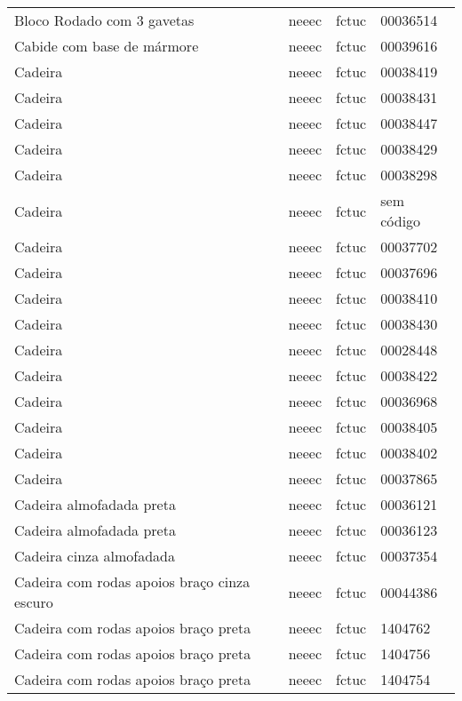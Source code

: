 \begin{longtable}{Xlll}
Bloco Rodado com 3 gavetas & \acrshort{neeec} & \acrshort{fctuc} & 00036514\\
Cabide com base de mármore & \acrshort{neeec} & \acrshort{fctuc} & 00039616\\
Cadeira & \acrshort{neeec} & \acrshort{fctuc} & 00038419\\
Cadeira & \acrshort{neeec} & \acrshort{fctuc} & 00038431\\
Cadeira & \acrshort{neeec} & \acrshort{fctuc} & 00038447\\
Cadeira & \acrshort{neeec} & \acrshort{fctuc} & 00038429\\
Cadeira & \acrshort{neeec} & \acrshort{fctuc} & 00038298\\
Cadeira & \acrshort{neeec} & \acrshort{fctuc} & sem código\\
Cadeira & \acrshort{neeec} & \acrshort{fctuc} & 00037702\\
Cadeira & \acrshort{neeec} & \acrshort{fctuc} & 00037696\\
Cadeira & \acrshort{neeec} & \acrshort{fctuc} & 00038410\\
Cadeira & \acrshort{neeec} & \acrshort{fctuc} & 00038430\\
Cadeira & \acrshort{neeec} & \acrshort{fctuc} & 00028448\\
Cadeira & \acrshort{neeec} & \acrshort{fctuc} & 00038422\\
Cadeira & \acrshort{neeec} & \acrshort{fctuc} & 00036968\\
Cadeira & \acrshort{neeec} & \acrshort{fctuc} & 00038405\\
Cadeira & \acrshort{neeec} & \acrshort{fctuc} & 00038402\\
Cadeira & \acrshort{neeec} & \acrshort{fctuc} & 00037865\\
Cadeira almofadada preta & \acrshort{neeec} & \acrshort{fctuc} & 00036121\\
Cadeira almofadada preta & \acrshort{neeec} & \acrshort{fctuc} & 00036123\\
Cadeira cinza almofadada & \acrshort{neeec} & \acrshort{fctuc} & 00037354\\
Cadeira com rodas apoios braço cinza escuro & \acrshort{neeec} & \acrshort{fctuc} & 00044386\\
Cadeira com rodas apoios braço preta & \acrshort{neeec} & \acrshort{fctuc} & 1404762\\
Cadeira com rodas apoios braço preta & \acrshort{neeec} & \acrshort{fctuc} & 1404756\\
Cadeira com rodas apoios braço preta & \acrshort{neeec} & \acrshort{fctuc} & 1404754\\

\end{longtable}
